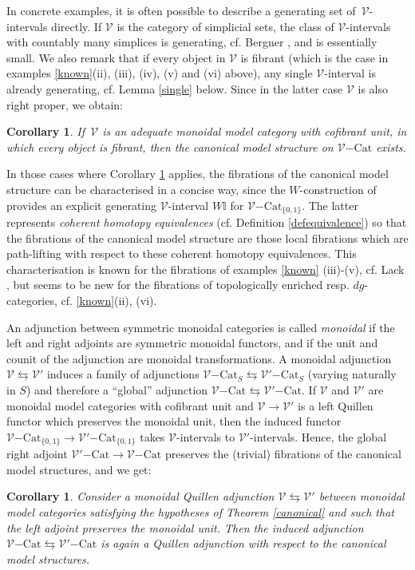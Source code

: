 \documentclass[10pt]{amsart}
\theoremstyle{plain}
\newtheorem{cor}[subsection]{Corollary}
\theoremstyle{remark}
\def\Vv{\mathcal{V}}
\def\Cat{\mathrm{Cat}}
\def\VCat{\Vv\mathrm{-}\Cat}
\def\V'Cat{\Vv'\mathrm{-}\Cat}
\def\Iso{\mathbb{I}}
\def\lra{\leftrightarrows}
\begin{document}
In concrete examples, it is often possible to describe a generating set of $\,\Vv$-intervals directly. If $\Vv$ is the category of simplicial sets, the class of $\Vv$-intervals with countably many simplices is generating, cf. Bergner \cite[Lemmas 4.2 and 4.3]{Be1}, and is essentially small. We also remark that if every object in $\Vv$ is fibrant (which is the case in examples \ref{known}(ii), (iii), (iv), (v) and (vi) above), any single $\Vv$-interval is already generating, cf. Lemma \ref{single} below. Since in the latter case $\Vv$ is also right proper, we obtain:

\begin{cor}\label{allfibrant}If $\,\Vv$ is an adequate monoidal model category with cofibrant unit, in which every object is fibrant, then the canonical model structure on $\VCat$ exists.\end{cor}

In those cases where Corollary \ref{allfibrant} applies, the fibrations of the canonical model structure can be characterised in a concise way, since the $W$-construction of \cite{BM1,BM2} provides an explicit generating $\Vv$-interval $W\Iso$ for $\VCat_{\{0,1\}}$. The latter represents \emph{coherent homotopy equivalences} (cf. Definition \ref{defequivalence}) so that the fibrations of the canonical model structure are those local fibrations which are path-lifting with respect to these coherent homotopy equivalences. This characterisation is known for the fibrations of examples \ref{known} (iii)-(v), cf. Lack \cite{La,La2}, but seems to be new for the fibrations of topologically enriched resp. $dg$- categories, cf. \ref{known}(ii), (vi).\vspace{1ex}

An adjunction between symmetric monoidal categories is called \emph{monoidal} if the left and right adjoints are symmetric monoidal functors, and if the unit and counit of the adjunction are monoidal transformations. A monoidal adjunction $\Vv\lra\Vv'$ induces a family of adjunctions $\VCat_S\lra\V'Cat_S$ (varying naturally in $S$) and therefore a ``global'' adjunction $\VCat\lra\V'Cat$. If $\Vv$ and $\Vv'$ are monoidal model categories with cofibrant unit and $\Vv\to\Vv'$ is a left Quillen functor which preserves the monoidal unit, then the induced functor $\VCat_{\{0,1\}}\to\V'Cat_{\{0,1\}}$ takes $\Vv$-intervals to $\Vv'$-intervals. Hence, the global right adjoint $\V'Cat\to\VCat$ preserves the (trivial) fibrations of the canonical model structures, and we get:

\begin{cor}Consider a monoidal Quillen adjunction $\Vv\lra\Vv'$ between monoidal model categories satisfying the hypotheses of Theorem \ref{canonical} and such that the left adjoint preserves the monoidal unit. Then the induced adjunction $\VCat\lra\V'Cat$ is again a Quillen adjunction with respect to the canonical model structures.\end{cor}
\end{document}

